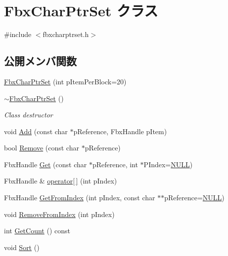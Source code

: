 \hypertarget{class_fbx_char_ptr_set}{}\section{Fbx\+Char\+Ptr\+Set クラス}
\label{class_fbx_char_ptr_set}


{\ttfamily \#include $<$fbxcharptrset.\+h$>$}

\subsection*{公開メンバ関数}
\begin{DoxyCompactItemize}
\item 
\hyperlink{class_fbx_char_ptr_set_a7f12f3a80a0e523ecb890aaa093c2aad}{Fbx\+Char\+Ptr\+Set} (int p\+Item\+Per\+Block=20)
\item 
\hyperlink{class_fbx_char_ptr_set_adbdbfd04a21ccc2d880de34d74f96771}{$\sim$\+Fbx\+Char\+Ptr\+Set} ()
\begin{DoxyCompactList}\small\item\em Class destructor \end{DoxyCompactList}\item 
void \hyperlink{class_fbx_char_ptr_set_a9efd684cdc4dbb93168c91fb717e89b1}{Add} (const char $\ast$p\+Reference, Fbx\+Handle p\+Item)
\item 
bool \hyperlink{class_fbx_char_ptr_set_afb7850c77043dd57c0fae1743ca01d29}{Remove} (const char $\ast$p\+Reference)
\item 
Fbx\+Handle \hyperlink{class_fbx_char_ptr_set_a626ae8a1c9406567c09755f467902b84}{Get} (const char $\ast$p\+Reference, int $\ast$P\+Index=\hyperlink{fbxarch_8h_a070d2ce7b6bb7e5c05602aa8c308d0c4}{N\+U\+LL})
\item 
Fbx\+Handle \& \hyperlink{class_fbx_char_ptr_set_a925f5012e7dd515e1d3c44584c97101d}{operator\mbox{[}$\,$\mbox{]}} (int p\+Index)
\item 
Fbx\+Handle \hyperlink{class_fbx_char_ptr_set_ab201112f7e7bbdad802978c451c41680}{Get\+From\+Index} (int p\+Index, const char $\ast$$\ast$p\+Reference=\hyperlink{fbxarch_8h_a070d2ce7b6bb7e5c05602aa8c308d0c4}{N\+U\+LL})
\item 
void \hyperlink{class_fbx_char_ptr_set_a2cfe1b7b1f73100b37decf29b3dba45e}{Remove\+From\+Index} (int p\+Index)
\item 
int \hyperlink{class_fbx_char_ptr_set_ab62ea2f88eed06e033e4ae7c516e96a0}{Get\+Count} () const
\item 
void \hyperlink{class_fbx_char_ptr_set_a54d7c3c3b927eb0040f0235b5aaff717}{Sort} ()
$$
\end{DoxyCompactItemize}
